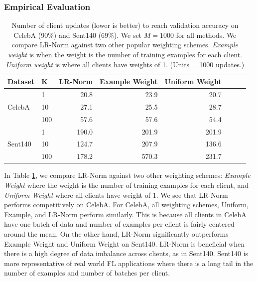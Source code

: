 \documentclass[twoside]{article}
\newcommand\Tstrut{\rule{0pt}{2.6ex}}         %
\newcommand{\lrn}{{LR-Norm}\xspace}
\begin{document}
\subsubsection{Empirical Evaluation}

\begin{table}
\centering
\caption{Number of client updates (lower is better) to reach validation accuracy on CelebA (90\%) and Sent140 (69\%). We set $M = 1000$ for all methods. We compare \lrn{} against two other popular weighting schemes. {\em Example weight} is when the weight is the number of training examples for each client. {\em Uniform weight} is where all clients have weights of 1. (Units = 1000 updates.)}
\label{tab:lrn}
\begin{tabular}{llrrrlll} 
\toprule
Dataset & K & \lrn{} & Example Weight & Uniform Weight  \\ 
\hline
\Tstrut{}
        &   1                      & 20.8                       & 23.9                             & 20.7 \\
CelebA  &   10                     & 27.1                       & 25.5                             & 28.7 \\       
        &   100                    & 57.6                       & 57.6                             & 54.4  \\ 
\hline
\Tstrut{}
        &    1                      & 190.0                      & 201.9                            & 201.9  \\
Sent140 &   10                      & 124.7                      & 207.9                            & 136.6  \\
        &   100                     & 178.2                      & 570.3                            & 231.7 \\
\bottomrule
\end{tabular}
\end{table}

In Table \ref{tab:lrn}, we compare \lrn{} against two other weighting schemes: {\em Example Weight } where the weight is the number of training examples for each client, and {\em Uniform Weight} where all clients have weight of 1. We see that \lrn{} performs competitively on CelebA. For CelebA, all weighting schemes,  Uniform, Example, and \lrn{} perform similarly. This is because all clients in CelebA have one batch of data and number of examples per client is fairly centered around the mean. On the other hand, \lrn{} significantly outperforms Example Weight and Uniform Weight on Sent140. \lrn{} is beneficial when there is a high degree of data imbalance across clients, as in Sent140. Sent140 is more representative of real world FL applications where there is a long tail in the number of examples and number of batches per client. 
\end{document}
